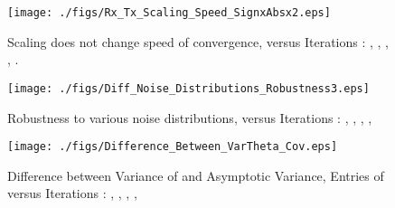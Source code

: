 \documentclass[onecolumn, draft, 12pt]{IEEEtran}
\begin{document}
\begin{figure}[tb]
\begin{minipage}{1\textwidth}
\centering
\begin{center}
\texttt{[image: ./figs/Rx\_Tx\_Scaling\_Speed\_SignxAbsx2.eps]} \caption{Scaling  does not change speed of convergence,  versus Iterations : , , , , .}\label{fig:Rx_Tx_Scaling_Speed_SignxAbsx2}
\end{center}
\end{minipage}
\end{figure}

\begin{figure}[tb]
\begin{minipage}{1\textwidth}
\centering
\begin{center}
\texttt{[image: ./figs/Diff\_Noise\_Distributions\_Robustness3.eps]} 
\caption{Robustness to various noise distributions,  versus Iterations : , , , , }\label{fig:Diff_Noise_Distributions_Robustness3}
\end{center}
\end{minipage}
\end{figure}


\begin{figure}[tb]
\begin{minipage}{1\textwidth}
\centering
\begin{center}
\texttt{[image: ./figs/Difference\_Between\_VarTheta\_Cov.eps]}
\caption{Difference between Variance of  and Asymptotic Variance, Entries of  versus Iterations : , , , , }\label{fig:Difference_Between_VarTheta_Cov}
\end{center}
\end{minipage}
\end{figure}
\end{document}

